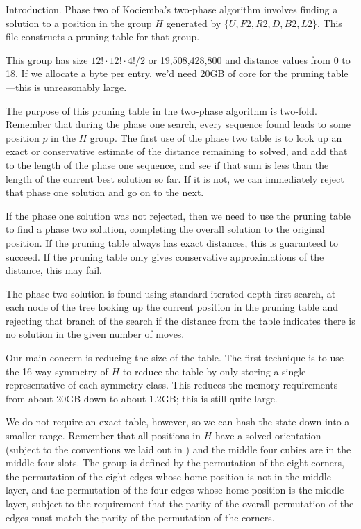
\def\mod{\mathop{mod}}


Introduction.
Phase two of Kociemba's two-phase algorithm involves finding a
solution to a position in the group $H$ generated by
$\{U,F2,R2,D,B2,L2\}$.  This file constructs a pruning table for
that group.

This group has size $12!\cdot 12!\cdot 4!/2$ or 19,508,428,800 and
distance values from 0 to 18.  If we allocate a byte per entry, we'd
need 20GB of core for the pruning table---this is unreasonably large.

The purpose of this pruning table in the two-phase algorithm is
two-fold.  Remember that during the phase one search, every sequence
found leads to some position $p$ in the $H$ group.  The first use of
the phase two table is to look up an exact or conservative estimate of
the distance remaining to solved, and add that to the length of the
phase one sequence, and see if that sum is less than the length of the
current best solution so far.  If it is not, we can immediately reject
that phase one solution and go on to the next.

If the phase one solution was not rejected, then we need to use the
pruning table to find a phase two solution, completing the overall
solution to the original position.  If the pruning table always has
exact distances, this is guaranteed to succeed.  If the pruning table
only gives conservative approximations of the distance, this may fail.

The phase two solution is found using standard iterated depth-first
search, at each node of the tree looking up the current position in
the pruning table and rejecting that branch of the search if the
distance from the table indicates there is no solution in the given
number of moves.

Our main concern is reducing the size of the table.  The first
technique is to use the 16-way symmetry of $H$ to reduce the table by
only storing a single representative of each symmetry class.  This
reduces the memory requirements from about 20GB down to about 1.2GB;
this is still quite large.

We do not require an exact table, however, so we can hash the state
down into a smaller range.  Remember that all positions in $H$ have a
solved orientation (subject to the conventions we laid out in
) and the middle four cubies are in the middle four slots.
The group is defined by the permutation of the eight corners, the
permutation of the eight edges whose home position is not in the
middle layer, and the permutation of the four edges whose home
position is the middle layer, subject to the requirement that the
parity of the overall permutation of the edges must match the parity
of the permutation of the corners.

